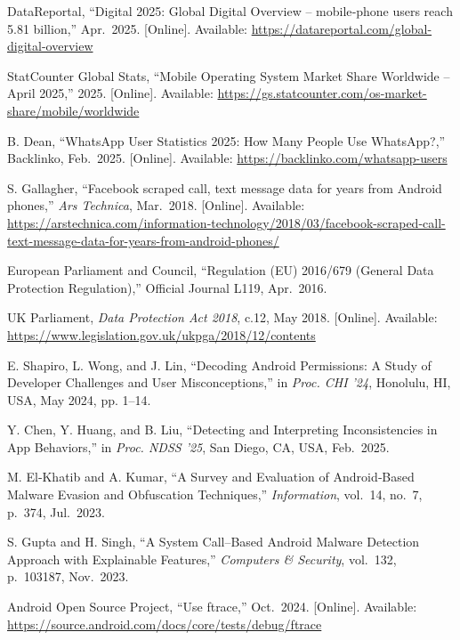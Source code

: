 \documentclass[a4paper,12pt]{report}
\begin{document}
\begin{thebibliography}{99}
DataReportal, “Digital 2025: Global Digital Overview – mobile‐phone users reach 5.81 billion,” Apr.\ 2025.  [Online]. Available: \url{https://datareportal.com/global-digital-overview}

StatCounter Global Stats, “Mobile Operating System Market Share Worldwide – April 2025,” 2025. [Online]. Available: \url{https://gs.statcounter.com/os-market-share/mobile/worldwide}

B. Dean, “WhatsApp User Statistics 2025: How Many People Use WhatsApp?,” Backlinko, Feb.\ 2025.  [Online]. Available: \url{https://backlinko.com/whatsapp-users}

S. Gallagher, “Facebook scraped call, text message data for years from Android phones,” \emph{Ars Technica}, Mar.\ 2018.  [Online]. Available: \url{https://arstechnica.com/information-technology/2018/03/facebook-scraped-call-text-message-data-for-years-from-android-phones/}

European Parliament and Council, “Regulation (EU) 2016/679 (General Data Protection Regulation),” Official Journal L119, Apr.\ 2016.

UK Parliament, \emph{Data Protection Act 2018}, c.12, May 2018.  [Online]. Available: \url{https://www.legislation.gov.uk/ukpga/2018/12/contents}

E. Shapiro, L. Wong, and J. Lin, “Decoding Android Permissions: A Study of Developer Challenges and User Misconceptions,” in \emph{Proc. CHI ’24}, Honolulu, HI, USA, May 2024, pp. 1–14.

Y. Chen, Y. Huang, and B. Liu, “Detecting and Interpreting Inconsistencies in App Behaviors,” in \emph{Proc. NDSS ’25}, San Diego, CA, USA, Feb.\ 2025.

M. El‐Khatib and A. Kumar, “A Survey and Evaluation of Android‐Based Malware Evasion and Obfuscation Techniques,” \emph{Information}, vol.\ 14, no.\ 7, p.~374, Jul.\ 2023.

S. Gupta and H. Singh, “A System Call–Based Android Malware Detection Approach with Explainable Features,” \emph{Computers \& Security}, vol.\ 132, p.~103187, Nov.\ 2023.

Android Open Source Project, “Use ftrace,” Oct.\ 2024.  [Online]. Available: \url{https://source.android.com/docs/core/tests/debug/ftrace}


\end{thebibliography}
\end{document}
